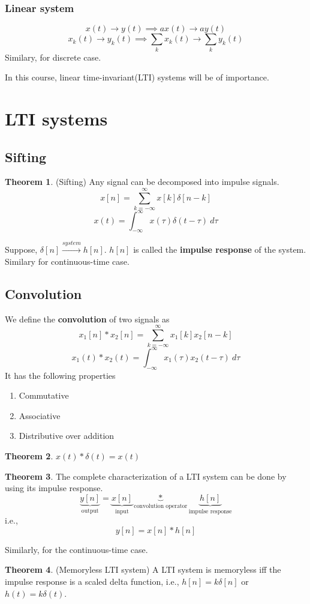 \documentclass[10pt, a4paper]{extarticle}
\theoremstyle{definition}
\newtheorem*{thm}{Theorem}
\begin{document}
  \subsubsection{Linear system}
  \[x(t)\to y(t)\implies ax(t)\to ay(t)\tag*{(Homogeneity)}\]
  \[x_k(t)\to y_k(t)\implies \sum_k x_k(t)\to\sum_k y_k(t)\tag*{(Additivity)}\]
	Similary, for discrete case.

  In this course, linear time-invariant(LTI) systems will be of importance.
  \section{LTI systems}
  \subsection{Sifting}
  \begin{thm}(Sifting)
	  Any signal can be decomposed into impulse signals.
	  \[x[n]=\sum_{k=-\infty}^\infty x[k]\delta[n-k]\]
	  \[x(t)=\int_{-\infty}^{\infty}x(\tau)\delta(t-\tau)\ d\tau\]
  \end{thm}
  Suppose, $\delta[n]\xrightarrow{system}h[n]$. $h[n]$ is called the \textbf{impulse response} of the system. Similary for continuous-time case.
  \subsection{Convolution}
	We define the \textbf{convolution} of two signals as
  \[x_1[n]*x_2[n]=\sum_{k=-\infty}^\infty x_1[k]x_2[n-k]\]
  \[x_1(t)*x_2(t)=\int_{-\infty}^{\infty}x_1(\tau)x_2(t-\tau)\ d\tau\]
  It has the following properties
  \begin{enumerate}
	  \item Commutative
	  \item Associative
	  \item Distributive over addition
	  \end{enumerate}
\begin{thm}
		$x(t)*\delta(t)=x(t)$
	\end{thm}
  \begin{thm}
	  The complete characterization of a LTI system can be done by using its impulse response.
	  \[\underbrace{y[n]}_{\text{output}}=\underbrace{x[n]}_{\text{input}}\underbrace{*}_{\text{convolution operator}}\underbrace{h[n]}_{\text{impulse response}}\]
	  i.e.,\[y[n]=x[n]*h[n]\]
  \end{thm}
  Similarly, for the continuous-time case.

  	\begin{thm}(Memoryless LTI system)
		A LTI system is memoryless iff the impulse response is a scaled delta function, i.e., $h[n]=k\delta[n]$ or $h(t)=k\delta(t)$.
	\end{thm}
\end{document}
